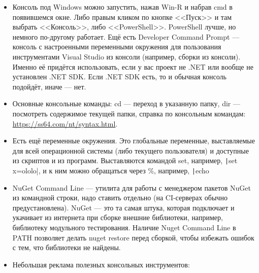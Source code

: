 \documentclass[a5paper]{article}
\begin{document}
\begin{itemize}
    \item Консоль под Windows можно запустить, нажав Win-R и набрав cmd в появившемся окне. Либо правым кликом по кнопке <<Пуск>> и там выбрать <<Консоль>>, либо <<PowerShell>>. PowerShell лучше, но немного по-другому работает. Ещё есть Developer Command Prompt --- консоль с настроенными переменными окружения для пользования инструментами Visual Studio из консоли (например, сборки из консоли). Именно её  придётся использовать, если у вас проект не .NET или вообще не установлен .NET SDK. Если .NET SDK есть, то и обычная консоль подойдёт, иначе --- нет.
    \item Основные консольные команды: cd --- переход в указанную папку, dir --- посмотреть содержимое текущей папки, справка по консольным командам: \url{https://ss64.com/nt/syntax.html}.
    \item Есть ещё переменные окружения. Это глобальные переменные, выставляемые для всей операционной системы (либо текущего пользователя) и доступные из скриптов и из программ. Выставляются командой set, например, \texttt|set x=ololo|, и к ним можно обращаться через \%, например, \texttt|echo %
    \item NuGet Command Line --- утилита для работы с менеджером пакетов NuGet из командной строки, надо ставить отдельно (на CI-серверах обычно предустановлена). NuGet --- это та самая штука, которая подключает и укачивает из интернета при сборке внешние библиотеки, например, библиотеку модульного тестирования. Наличие Nuget Command Line в PATH позволяет делать nuget restore перед сборкой, чтобы избежать ошибок с тем, что библиотеки не найдены.
    \item Небольшая реклама полезных консольных инструментов:

\end{itemize}
\end{document}
